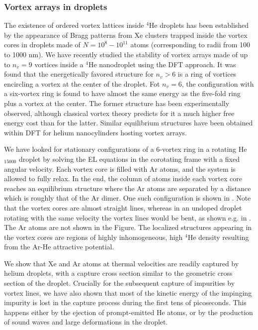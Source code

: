  	\subsubsection*{Vortex arrays in droplets}
 	The existence of ordered vortex lattices inside $^4$He droplets has been established  by the appearance of Bragg patterns from 
Xe clusters trapped inside the vortex cores  in droplets made of $N= 10^8 - 10^{11}$ atoms
(corresponding to radii from 100 to 1000 nm)\citep{Gom14,Jones2016}. We have 
recently studied the stability of vortex 
arrays made of up to $n_v=9$ vortices
inside a $^4$He nanodroplet using the DFT approach\citep{Anc15}.  
It was found that 
the energetically favored structure for $n_v > 6$ is a ring 
of vortices encircling a vortex at the center of the droplet.
Fot $n_v=6$,  the 
configuration with a six-vortex ring is found to have almost 
the same energy as the five-fold ring
plus a vortex at the center. The former structure 
has been experimentally observed\citep{Gom14,Jones2016,Ber17}, 
although classical vortex theory 
predicts for it a much higher free energy cost than for the latter\citep{Cam79}.
Similar equilibrium structures have been obtained within DFT for
helium nanocylinders hosting vortex arrays\citep{Anc14}.

We have looked for stationary configurations of a 6-vortex ring
in a rotating He$_{15000}$ droplet by solving the
EL equations in the corotating frame with a fixed
angular velocity. Each vortex core is filled with Ar
atoms, and the system is allowed to fully relax.
In the end, the column of atoms inside each vortex core reaches an equilibrium structure 
where the Ar atoms are separated by a distance which  is roughly that of the Ar dimer.
One such configuration is shown in . Note that 
the vortex cores are almost straight lines, whereas in an
undoped droplet rotating with the same velocity 
the vortex lines would be bent, 
as shown  e.g. in .
The Ar atoms are not shown in the Figure.
The localized structures appearing in the vortex cores are 
regions of highly inhomogeneous, high  $^4$He density
resulting from the Ar-He attractive potential.
	
	
		We show that Xe and Ar atoms at thermal velocities are readily captured by helium droplets, with a capture cross section similar to the geometric cross section of the droplet. Crucially for the subsequent capture of impurities by vortex lines, we have also shown that most of the kinetic energy of the impinging impurity is lost in the capture process during the first tens of picoseconds. This happens either by the ejection of prompt-emitted He atoms, or by the production of sound waves and large deformations in the droplet. 

